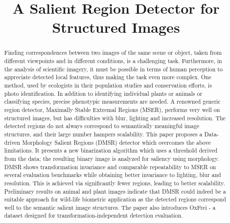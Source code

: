 \documentclass[conference,compsoc]{IEEEtran}
\begin{document}
%
\title{A Salient Region Detector for Structured Images}


\author{
}

\maketitle

\begin{abstract}
Finding correspondences between two images of the same scene or object, taken from different viewpoints and in different conditions, is a challenging task. Furthermore, in the analysis of scientific imagery, it must be possible in terms of human perception to appreciate detected local features, thus making the task even more complex. One method, used by ecologists in their population studies and conservation efforts, is photo identification. In addition to identifying individual plants or animals or classifying species, precise phenotypic measurements are needed. A renowned generic region detector, Maximally Stable Extremal Regions (MSER), performs very well on structured images, but has difficulties with blur, lighting and increased resolution. The detected regions do not always correspond to semantically meaningful image structures, and their large number hampers scalability. This paper proposes a Data-driven Morphology Salient Regions (DMSR) detector which overcomes the above limitations. It presents a new binarization algorithm which uses a threshold derived from the data; the resulting binary image is analyzed for saliency using morphology. DMSR shows transformation invariance and comparable repeatability to MSER on several evaluation benchmarks while obtaining better invariance to lighting, blur and resolution. This is achieved via significantly fewer regions, leading to better scalability. Preliminary results on animal and plant images indicate that DMSR could indeed be a suitable approach for wild-life biometric application as the detected regions correspond well to the semantic salient image structures. The paper also introduces OxFrei - a dataset designed for transformation-independent detection evaluation. 

\end{abstract}
\end{document}
